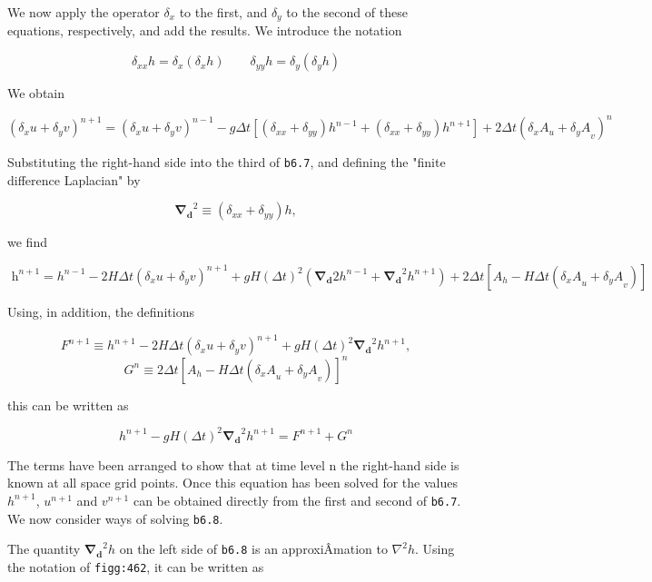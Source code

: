 We now apply the operator \(\delta_{x}\) to the first, and
\(\delta_{y}\) to the second of these equations, respectively, and add
the results. We introduce the notation

\[\delta_{xx}h = \delta_x(\delta_x h ) \qquad  \delta_{yy}h = \delta_y(\delta_y h )\]

We obtain

\[\left( \delta_{x}u + \delta_{y}v \right)^{n + 1} =
\left( \delta_{x}u + \delta_{y}v \right)^{n - 1} 
- g\Delta t \left[ ( \delta_{xx} + \delta_{yy} )h^{n - 1} 
+ ( \delta_{xx} + \delta_{yy} )h^{n + 1}\right] +
2\Delta t( \delta_{x}A_{u} + {\delta_{y}A}_{v})^{n}\]

Substituting the right-hand side into the third of \texttt{b6.7}, and
defining the "finite difference Laplacian" by

\[\mathbf{\nabla_d}^2 \equiv ( \delta_{xx} + \delta_{yy} )h,\]

we find

\[\text{  h}^{n + 1} = h^{n - 1} - 2H\Delta t\left( \delta_{x}u + \delta_{y}v \right)^{n + 1}
 + gH\left( \Delta t \right)^{2}\left( \mathbf{\nabla_d}{2}h^{n - 1} + \mathbf{\nabla_d}^{2}h^{n + 1} \right) 
 + 2\Delta t\left\lbrack A_{h} - H\Delta t\left( {\delta_{x}A}_{u} + {\delta_{y}A}_{v} \right) \right\rbrack\]

Using, in addition, the definitions

\[F^{n + 1} \equiv h^{n + 1} - 2H\Delta t \left( \delta_{x}u + \delta_{y}v \right)^{n + 1} + gH(\Delta t)^{2}\mathbf{\nabla_d}^2 h^{n + 1},\]\[G^{n} \equiv 2\Delta t \left\lbrack A_{h} - H\Delta t\left( {\delta_{x}A}_{u} + {\delta_{y}A}_{v} \right) \right\rbrack^{n}\]

this can be written as

{\[h^{n + 1} - gH(\Delta t )^{2}\mathbf{\nabla_d}^{2}h^{n + 1} = F^{n + 1} + G^{n}\]}

The terms have been arranged to show that at time level n the right-hand
side is known at all space grid points. Once this equation has been
solved for the values \(h^{n + 1}\), \(u^{n + 1}\) and \(v^{n + 1}\) can
be obtained directly from the first and second of \texttt{b6.7}. We now
consider ways of solving \texttt{b6.8}.

The quantity \(\mathbf{\nabla_d}^{2}h\) on the left side of
\texttt{b6.8} is an approxiÂ­mation to \(\nabla^{2}h\). Using the
notation of \texttt{figg:462}, it can be written as


